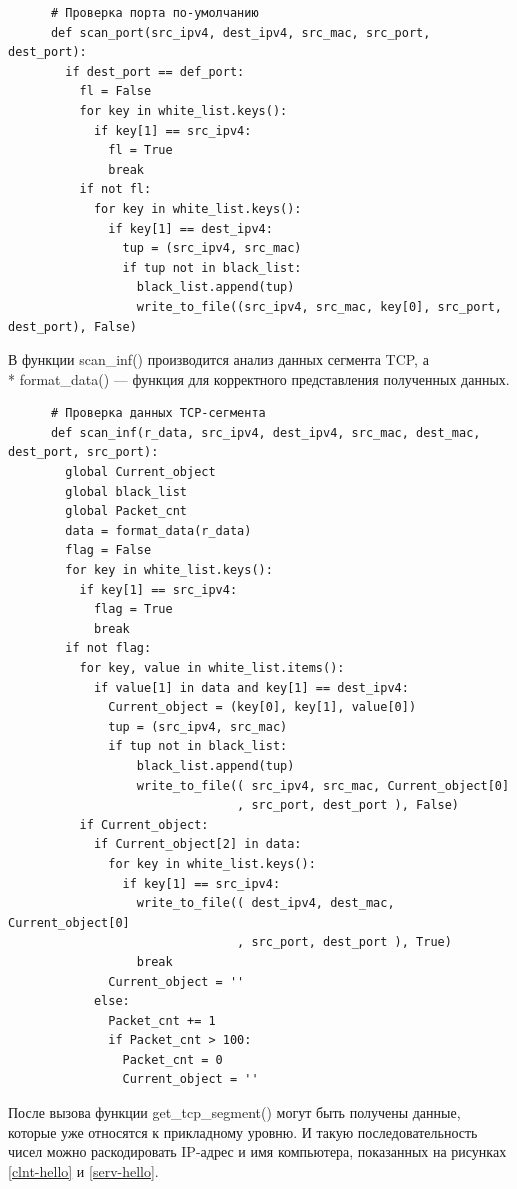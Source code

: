 \documentclass[bachelor, och, coursework]{SCWorks}
\begin{document}
    \begin{verbatim}
      # Проверка порта по-умолчанию
      def scan_port(src_ipv4, dest_ipv4, src_mac, src_port, dest_port):
        if dest_port == def_port:
          fl = False
          for key in white_list.keys():
            if key[1] == src_ipv4:
              fl = True
              break
          if not fl:
            for key in white_list.keys():
              if key[1] == dest_ipv4:
                tup = (src_ipv4, src_mac)    
                if tup not in black_list:
                  black_list.append(tup)
                  write_to_file((src_ipv4, src_mac, key[0], src_port, dest_port), False)
    \end{verbatim}

    В функции scan\_inf() производится анализ данных сегмента TCP, а \\* format\_data() --- функция для корректного представления полученных данных.

    \begin{verbatim}
      # Проверка данных TCP-сегмента
      def scan_inf(r_data, src_ipv4, dest_ipv4, src_mac, dest_mac, dest_port, src_port):
        global Current_object
        global black_list
        global Packet_cnt
        data = format_data(r_data)
        flag = False
        for key in white_list.keys():
          if key[1] == src_ipv4:
            flag = True
            break
        if not flag:
          for key, value in white_list.items():
            if value[1] in data and key[1] == dest_ipv4:
              Current_object = (key[0], key[1], value[0])
              tup = (src_ipv4, src_mac)
              if tup not in black_list:
                  black_list.append(tup)
                  write_to_file(( src_ipv4, src_mac, Current_object[0]
                                , src_port, dest_port ), False)
          if Current_object:
            if Current_object[2] in data:
              for key in white_list.keys():
                if key[1] == src_ipv4:
                  write_to_file(( dest_ipv4, dest_mac, Current_object[0]
                                , src_port, dest_port ), True)
                  break
              Current_object = ''
            else:
              Packet_cnt += 1
              if Packet_cnt > 100:
                Packet_cnt = 0
                Current_object = '' 
    \end{verbatim}
    
    После вызова функции get\_tcp\_segment() могут быть получены данные, которые уже относятся к прикладному уровню. И такую последовательность чисел
    можно раскодировать IP-адрес и имя компьютера, показанных на рисунках \ref{clnt-hello} и \ref{serv-hello}.
\end{document}
